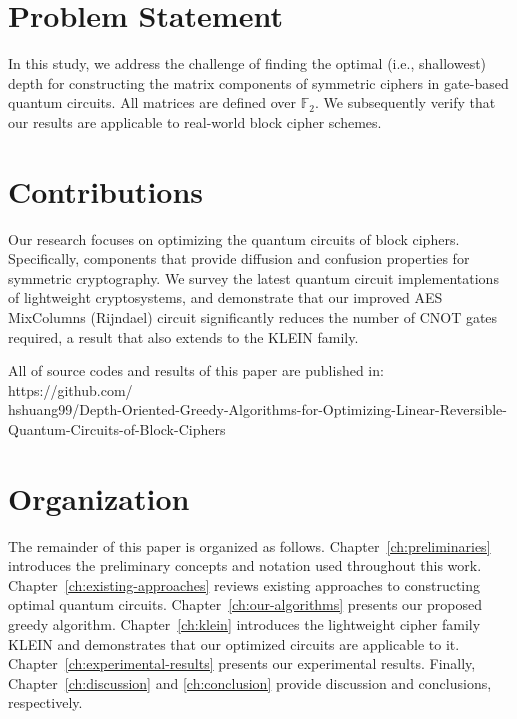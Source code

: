 \section{Problem Statement}
In this study, we address the challenge of finding the optimal (i.e., shallowest) depth for constructing the matrix components of symmetric ciphers in gate-based quantum circuits. All matrices are defined over $\mathbb{F}_{2}$. We subsequently verify that our results are applicable to real-world block cipher schemes.

\section{Contributions}
Our research focuses on optimizing the quantum circuits of block ciphers. Specifically, components that provide diffusion and confusion properties for symmetric cryptography. We survey the latest quantum circuit implementations of lightweight cryptosystems, and demonstrate that our improved AES MixColumns (Rijndael) circuit significantly reduces the number of CNOT gates required, a result that also extends to the KLEIN family.

All of source codes and results of this paper are published in: https://github.com/\\hshuang99/Depth-Oriented-Greedy-Algorithms-for-Optimizing-Linear-Reversible-\\Quantum-Circuits-of-Block-Ciphers

\section{Organization}
The remainder of this paper is organized as follows. Chapter~\ref{ch:preliminaries} introduces the preliminary concepts and notation used throughout this work. Chapter~\ref{ch:existing-approaches} reviews existing approaches to constructing optimal quantum circuits. Chapter~\ref{ch:our-algorithms} presents our proposed greedy algorithm. Chapter~\ref{ch:klein} introduces the lightweight cipher family KLEIN and demonstrates that our optimized circuits are applicable to it. Chapter~\ref{ch:experimental-results} presents our experimental results. Finally, Chapter~\ref{ch:discussion} and \ref{ch:conclusion} provide discussion and conclusions, respectively.